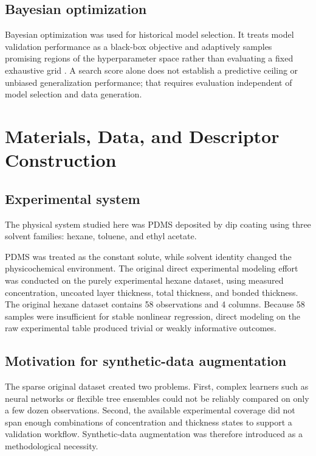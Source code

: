 \documentclass[11pt]{article}
\begin{document}
\subsection{Bayesian optimization}
Bayesian optimization was used for historical model selection. It treats model validation performance as a black-box objective and adaptively samples promising regions of the hyperparameter space rather than evaluating a fixed exhaustive grid \cite{snoek2012}. A search score alone does not establish a predictive ceiling or unbiased generalization performance; that requires evaluation independent of model selection and data generation.

\section{Materials, Data, and Descriptor Construction}

\subsection{Experimental system}
The physical system studied here was PDMS deposited by dip coating
using three solvent families: hexane, toluene, and ethyl acetate.

PDMS was treated as the constant solute, while solvent identity changed the physicochemical environment. The original direct experimental modeling effort was conducted on the purely experimental hexane dataset, using measured concentration, uncoated layer thickness, total thickness, and bonded thickness. The original hexane dataset contains 58 observations and 4 columns. Because 58 samples were insufficient for stable nonlinear regression, direct modeling on the raw experimental table produced trivial or weakly informative outcomes.

\subsection{Motivation for synthetic-data augmentation}
The sparse original dataset created two problems. First, complex learners such as neural networks or flexible tree ensembles could not be reliably compared on only a few dozen observations. Second, the available experimental coverage did not span enough combinations of concentration and thickness states to support a  validation workflow. Synthetic-data augmentation was therefore introduced as a methodological necessity.
\end{document}
